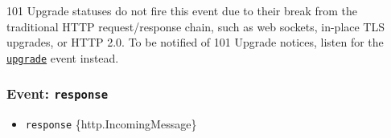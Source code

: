 \begin{Shaded}
\begin{Highlighting}[]
\OperatorTok{=} \NormalTok{(}\NormalTok{)}\OperatorTok{;}

\OperatorTok{=}\NormalTok{ \{}
  \OperatorTok{:} \OperatorTok{,}
  \OperatorTok{:} \OperatorTok{,}
  \OperatorTok{:} \OperatorTok{,}
\NormalTok{\}}\OperatorTok{;}

\OperatorTok{=}\OperatorTok{;}
\NormalTok{()}\OperatorTok{;}

\NormalTok{(}\OperatorTok{,}\KeywordTok{=\textgreater{}}\NormalTok{ \{}
  \NormalTok{(}\SpecialCharTok{$\{}\SpecialCharTok{\}}\VerbatimStringTok{\textasciigrave{}}\NormalTok{)}\OperatorTok{;}
\NormalTok{\})}\OperatorTok{;}
\end{Highlighting}
\end{Shaded}

101 Upgrade statuses do not fire this event due to their break from the
traditional HTTP request/response chain, such as web sockets, in-place
TLS upgrades, or HTTP 2.0. To be notified of 101 Upgrade notices, listen
for the
\hyperref[event-upgrade]{\texttt{\textquotesingle{}upgrade\textquotesingle{}}}
event instead.

\subsubsection{\texorpdfstring{Event:
\texttt{\textquotesingle{}response\textquotesingle{}}}{Event: \textquotesingle response\textquotesingle{}}}\label{event-response}

\begin{itemize}
\tightlist
\item
  \texttt{response} \{http.IncomingMessage\}
\end{itemize}

